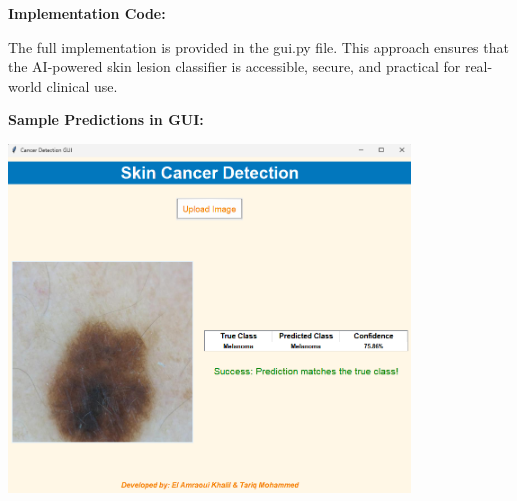 \documentclass[a4paper,12pt]{report}
\begin{document}
\begin{spacing}{1.5}
    \newpage
    \textbf{Implementation Code:}
    
    

    The full implementation is provided in the gui.py file. This approach ensures that the AI-powered skin lesion classifier is accessible, secure, and practical for real-world clinical use.
    
    \newpage
    \textbf{Sample Predictions in GUI:}
    \begin{center}
        \includegraphics[width=0.8\textwidth]{Pics/result1.png}
    \end{center}


\end{spacing}
\end{document}
